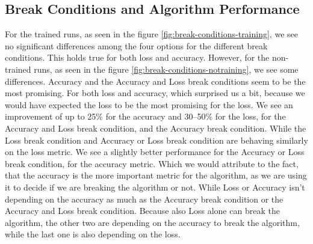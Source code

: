 \subsection{Break Conditions and Algorithm Performance}\label{subsec:break-conditions-and-algorithm-performance}
For the trained runs, as seen in the figure \ref{fig:break-conditions-training}, we see no significant differences among the four options for the different break conditions.
This holds true for both loss and accuracy.
However, for the non-trained runs, as seen in the figure \ref{fig:break-conditions-notraining}, we see some differences.
Accuracy and the Accuracy and Loss break conditions seem to be the most promising.
For both loss and accuracy, which surprised us a bit, because we would have expected the loss to be the most promising for the loss.
We see an improvement of up to 25\% for the accuracy and 30--50\% for the loss, for the Accuracy and Loss break condition, and the Accuracy break condition.
While the Loss break condition and Accuracy or Loss break condition are behaving similarly on the loss metric.
We see a slightly better performance for the Accuracy or Loss break condition, for the accuracy metric.
Which we would attribute to the fact, that the accuracy is the more important metric for the algorithm, as we are using it to decide if we are breaking the algorithm or not.
While Loss or Accuracy isn't depending on the accuracy as much as the Accuracy break condition or the Accuracy and Loss break condition.
Because also Loss alone can break the algorithm, the other two are depending on the accuracy to break the algorithm, while the last one is also depending on the loss.
